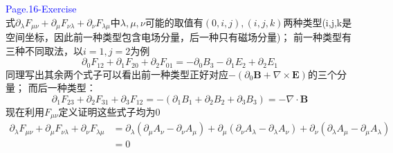 \documentclass[12pt, a4paper, oneside]{ctexart}
\begin{document}
\textcolor{blue}{Page.16-Exercise}\\
式${{\partial }_{\lambda }}{{F}_{\mu \nu }}+{{\partial }_{\mu }}{{F}_{\nu \lambda }}+{{\partial }_{\nu }}{{F}_{\lambda \mu }}$中$\lambda,\mu,\nu$可能的取值有$\left( 0,i,j \right),\left( i,j,k \right)$两种类型(i,j,k是空间坐标，因此前一种类型包含电场分量，后一种只有磁场分量)；
前一种类型有三种不同取法，以$i=1,j=2$为例
\[{{\partial }_{0}}{{F}_{12}}+{{\partial }_{1}}{{F}_{20}}+{{\partial }_{2}}{{F}_{01}}=-{{\partial }_{0}}{{B}_{3}}-{{\partial }_{1}}{{E}_{2}}+{{\partial }_{2}}{{E}_{1}}\]
同理写出其余两个式子可以看出前一种类型正好对应$-\left( {{\partial }_{0}}\mathbf{B}+\nabla \times \mathbf{E} \right)$的三个分量；
而后一种类型：
\[{{\partial }_{1}}{{F}_{23}}+{{\partial }_{2}}{{F}_{31}}+{{\partial }_{3}}{{F}_{12}}=-\left( {{\partial }_{1}}{{B}_{1}}+{{\partial }_{2}}{{B}_{2}}+{{\partial }_{3}}{{B}_{3}} \right)=-\nabla \cdot \mathbf{B}\]
现在利用$F_{\mu\nu}$定义证明这些式子均为0
\[\begin{aligned}
        {{\partial }_{\lambda }}{{F}_{\mu \nu }}+{{\partial }_{\mu }}{{F}_{\nu \lambda }}+{{\partial }_{\nu }}{{F}_{\lambda \mu }} & ={{\partial }_{\lambda }}\left( {{\partial }_{\mu }}{{A}_{\nu }}-{{\partial }_{\nu }}{{A}_{\mu }} \right)+{{\partial }_{\mu }}\left( {{\partial }_{\nu }}{{A}_{\lambda }}-{{\partial }_{\lambda }}{{A}_{\nu }} \right)+{{\partial }_{\nu }}\left( {{\partial }_{\lambda }}{{A}_{\mu }}-{{\partial }_{\mu }}{{A}_{\lambda }} \right) \\
                                                                                                                                   & =0                                                                                                                                                                                                                                                                                                                                  \\
    \end{aligned}\]
\end{document}
